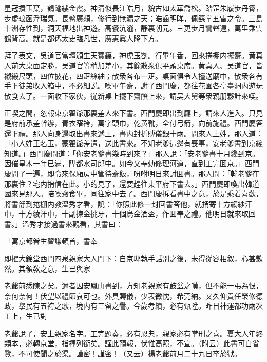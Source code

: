 \begin{myquote}
星冠攢玉葉，鶴氅縷金霞。神清似長江皓月，貌古如太華喬松。踏罡朱履步丹霄，步虚琅函浮瑞氣。長髯廣頰，修行到無漏之天；皓齒明眸，佩籙掌五雷之令。三島十洲存性到，洞天福地出神遊。高餐沆瀣，靜裏朝元。三更步月鸞聲遠，萬里乘雲鶴背高。就是都僊太史臨凡世，廣惠眞人降下方。
\end{myquote}

拜了表文，吳道官當壇頒生天寳籙，神虎玉劄。行畢午香，回來捲棚内擺齋。黄真人前大桌面定勝，吴道官等稍加差小，其餘散衆俱平頭桌席。黄真人、吴道官，皆襯緞尺頭，四位披花，四疋絲紬；散衆各布一疋。桌面俱令人擡送廟中，散衆各有手下徒弟收入箱中，不必細説。喫畢午齋，謝了西門慶，都往花園各亭臺洞内遊玩散食去了。一面收下家伙，従新桌上擺下齋饌上來，請吴大舅等衆親朋夥計來喫。

正喫之間，忽報東京翟爺那裏差人來下書。西門慶即出到廳上，請來人進入。只見是府前承差幹辦，青衣窄袴，萬字頭巾，乾黄靴，全付弓箭，向前施禮。西門慶答還下禮。那人向身邊取出書來遞上，書内封折賻儀銀十兩。問來人上姓，那人道：「小人姓王名玉，蒙翟爺差遣，送此書來。不知老爹這邊有喪事，安老爹書到京纔知道。」西門慶問道：「你安老爹書幾時到來？」那人說：「安老爹書十月纔到京。因催皇木一年已滿，陞都水司郎中。如今又奉勅修理河道，直到工完囬京。」西門慶問了一遍，即令來保廂房中管待齋飯，吩咐明日來討囬書。那人問：「韓老爹在那裏住？宅内捎信在此。小的見了，還要趕往東平府下書去。」西門慶即喚出韓道國來見那人。陪喫齋食畢，同往家中去了。西門慶拆看書中之意，於是乘着喜歡，將書㧱到捲棚内教溫秀才看，說：「你照此修一封回書答他，就捎寄十方縐紗汗巾，十方綾汗巾，十副揀金挑牙，十個烏金酒盃，作囬奉之禮。他明日就來取回書。」溫秀才接過書來觀看，其書曰：

\begin{myquote}[\markfont]
\hspace*{4em}「寓京都眷生翟謙頓首，書奉

即擢大錦堂西門四泉親家大人門下：自京邸執手話别之後，未得從容相叙，心甚歉然。其領敎之意，生已與家

老爺前悉陳之矣。邇者因安鳳山書到，方知老親家有鼓盆之嘆，但不能一弔為恨，奈何奈何！伏望以禮節哀可也。外具賻儀，少表微忱，希莞納。又久仰貴任榮修德政，擧民有五袴之歌，境内有三留之譽。今歲考績，必有甄陞。昨日神運都功兩次工上，生已對

老爺說了，安上親家名字。工完題奏，必有恩典，親家必有掌刑之喜。夏大人年終類本，必轉京堂，指揮列銜矣。謹此預報，伏惟高照，不宣。{\kaishu（附云）}此書可自省覽，不可使聞之於渠。謹密！謹密！{\kaishu（又云）}楊老爺前月二十九日卒於獄。

\end{myquote}

